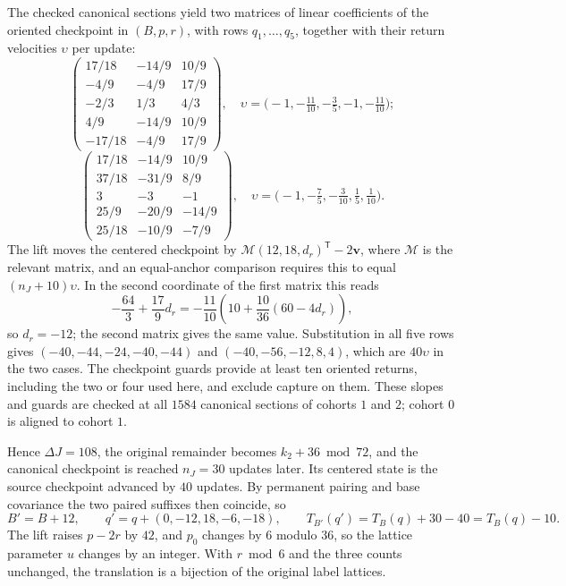 \documentclass[11pt,reqno]{amsart}
\theoremstyle{remark}
\newcommand{\vct}{\boldsymbol v}
\begin{document}
The checked canonical sections yield two matrices of linear coefficients of the oriented checkpoint in \((B,p,r)\), with rows \(q_1,\ldots,q_5\), together with their return velocities \(\upsilon\) per update:
\[
 \begin{pmatrix}
 17/18&-14/9&10/9\\ -4/9&-4/9&17/9\\ -2/3&1/3&4/3\\
 4/9&-14/9&10/9\\ -17/18&-4/9&17/9
 \end{pmatrix},\quad \upsilon=\bigl(-1,-\tfrac{11}{10},-\tfrac35,-1,-\tfrac{11}{10}\bigr);
\]
\[
 \begin{pmatrix}
 17/18&-14/9&10/9\\ 37/18&-31/9&8/9\\ 3&-3&-1\\
 25/9&-20/9&-14/9\\ 25/18&-10/9&-7/9
 \end{pmatrix},\quad \upsilon=\bigl(-1,-\tfrac75,-\tfrac3{10},\tfrac15,\tfrac1{10}\bigr).
\]
The lift moves the centered checkpoint by \(\mathcal M(12,18,d_r)^{\mathsf T}-2\vct\), where \(\mathcal M\) is the relevant matrix, and an equal-anchor comparison requires this to equal \((n_J+10)\upsilon\). In the second coordinate of the first matrix this reads
\[
 -\frac{64}{3}+\frac{17}{9}d_r=-\frac{11}{10}\left(10+\frac{10}{36}(60-4d_r)\right),
\]
so \(d_r=-12\); the second matrix gives the same value. Substitution in all five rows gives \((-40,-44,-24,-40,-44)\) and \((-40,-56,-12,8,4)\), which are \(40\upsilon\) in the two cases. The checkpoint guards provide at least ten oriented returns, including the two or four used here, and exclude capture on them. These slopes and guards are checked at all \(1584\) canonical sections of cohorts \(1\) and \(2\); cohort \(0\) is aligned to cohort \(1\).

Hence \(\Delta J=108\), the original remainder becomes \(k_2+36\bmod72\), and the canonical checkpoint is reached \(n_J=30\) updates later. Its centered state is the source checkpoint advanced by \(40\) updates. By permanent pairing and base covariance the two paired suffixes then coincide, so
\[
 B'=B+12,\qquad q'=q+(0,-12,18,-6,-18),\qquad T_{B'}(q')=T_B(q)+30-40=T_B(q)-10.
\]
The lift raises \(p-2r\) by \(42\), and \(p_0\) changes by \(6\) modulo \(36\), so the lattice parameter \(u\) changes by an integer. With \(r\bmod6\) and the three counts unchanged, the translation is a bijection of the original label lattices.
\end{document}

